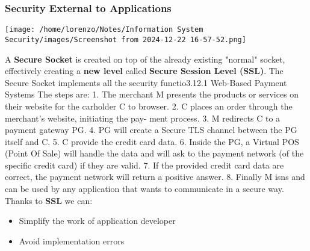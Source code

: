 \begin{minipage}{0.5\textwidth}
    \vspace{-1cm}
    \subsubsection{Security External to Applications}
    \begin{center}
        \centering
        \texttt{[image: /home/lorenzo/Notes/Information System Security/images/Screenshot from 2024-12-22 16-57-52.png]}
    \end{center}
    A \textbf{Secure Socket} is created on top of the already existing "normal" socket, effectively creating a \textbf{new level} called \textbf{Secure Session Level (SSL)}. The Secure Socket implements all the security functio3.12.1 Web-Based Payment Systems
    The steps are:
    1. The merchant M presents the products or services on their website
    for the carholder C to browser.
    2. C places an order through the merchant’s website, initiating the pay-
    ment process.
    3. M redirects C to a payment gateway PG.
    4. PG will create a Secure TLS channel between the PG itself and C.
    5. C provide the credit card data.
    6. Inside the PG, a Virtual POS (Point Of Sale) will handle the data
    and will ask to the payment network (of the specific credit card) if they
    are valid.
    7. If the provided credit card data are correct, the payment network will
    return a positive answer.
    8. Finally M isns and can be used by any application that wants to communicate in a secure way. Thanks to \textbf{SSL} we can: 
    \begin{itemize}
        \item Simplify the work of application developer
        \item Avoid implementation errors
    \end{itemize}
\end{minipage}
\newline
\\
\noindent{\color{gray!50}\rule{\textwidth}{0.5pt}}
